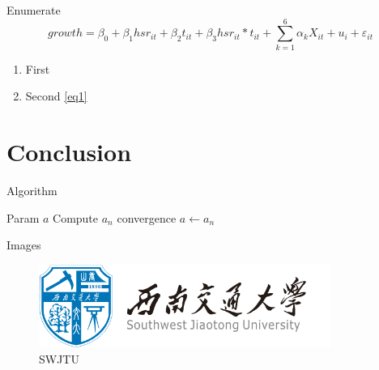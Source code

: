 \documentclass[11pt]{SWJTUBeamer}
\begin{document}
\begin{frame}{Enumerate}
    \begin{equation}
        growth=\beta_{0}+\beta_{1}hsr_{it}+\beta_{2}t_{it}+\beta_{3}hsr_{it}*t_{it}+\sum^{6}_{k=1}\alpha_{k}X_{it}+u_{i}+\varepsilon_{it}\label{eq1}
    \end{equation}
    \begin{enumerate}
        \item First 
        \item Second \eqref{eq1}
    \end{enumerate}
\end{frame}

\section{Conclusion}

\begin{frame}{Algorithm}
    \begin{algorithm2e}[H]
        \caption{Algorithm 1}\label{alg:em}
        \begin{algorithmic}[1]
            \REQUIRE Param
            \ENSURE $a$
            \REPEAT
            \STATE Compute $a_n$
            \UNTIL convergence
            \RETURN $a\leftarrow a_n$
        \end{algorithmic}
    \end{algorithm2e}
\end{frame}

\begin{frame}{Images}
    \begin{figure}
        \centering
        \includegraphics[width=0.85\textwidth]{swjtu_logo.png}
        \caption{SWJTU}\label{fig:jtu}
    \end{figure}
\end{frame}
\end{document}

